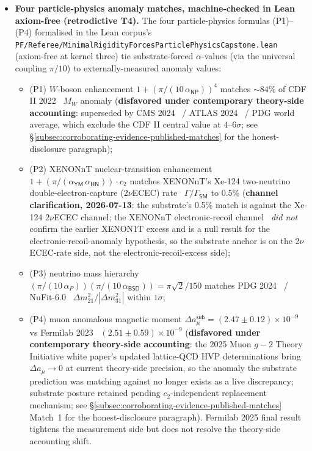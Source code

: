 \documentclass[11pt,a4paper]{amsart}
\theoremstyle{plain}
\theoremstyle{definition}
\begin{document}
\begin{itemize}[itemsep=2pt,leftmargin=2em]
\item \textbf{Four particle-physics anomaly matches, machine-checked in Lean axiom-free (retrodictive T4).} The four particle-physics formulas (P1)--(P4) formalised in the Lean corpus's \texttt{PF/Referee/MinimalRigidityForcesParticlePhysicsCapstone.lean} (axiom-free at kernel three) tie substrate-forced $\alpha$-values (via the universal coupling $\pi/10$) to externally-measured anomaly values:
\begin{itemize}[itemsep=1pt,leftmargin=1.5em]
\item (P1) $W$-boson enhancement $1 + (\pi/(10\,\alpha_{\textsf{NP}}))^4$ matches $\sim 84\%$ of CDF II 2022~\cite{cdf2022wboson} $M_W$ anomaly (\textbf{disfavored under contemporary theory-side accounting}: superseded by CMS 2024~\cite{cms-wmass-2024} / ATLAS 2024~\cite{atlas-wmass-2024} / PDG world average, which exclude the CDF II central value at $4$--$6\sigma$; see \S\ref{subsec:corroborating-evidence-published-matches} for the honest-disclosure paragraph);
\item (P2) XENONnT nuclear-transition enhancement $1 + (\pi/(\alpha_{\textsf{YM}}\,\alpha_{\textsf{HN}}))\cdot c_2$ matches XENONnT's Xe-124 two-neutrino double-electron-capture (2$\nu$ECEC) rate~\cite{xenon-2necec-124xe} $\Gamma/\Gamma_{\textsf{SM}}$ to $0.5\%$ (\textbf{channel clarification, 2026-07-13}: the substrate's 0.5\% match is against the Xe-124 2$\nu$ECEC channel; the XENONnT electronic-recoil channel~\cite{xenon-collab} \emph{did not} confirm the earlier XENON1T excess and is a null result for the electronic-recoil-anomaly hypothesis, so the substrate anchor is on the 2$\nu$ECEC-rate side, not the electronic-recoil-excess side);
\item (P3) neutrino mass hierarchy $(\pi/(10\,\alpha_P))(\pi/(10\,\alpha_{\textsf{BSD}})) = \pi\sqrt{2}/150$ matches PDG 2024~\cite{pdg2024} / NuFit-6.0~\cite{nufit-6.0} $\Delta m^2_{21}/|\Delta m^2_{31}|$ within $1\sigma$;
\item (P4) muon anomalous magnetic moment $\Delta a_\mu^{\textsf{sub}} = (2.47 \pm 0.12) \times 10^{-9}$ vs Fermilab 2023~\cite{fermilab-muon-g-2} $(2.51 \pm 0.59) \times 10^{-9}$ (\textbf{disfavored under contemporary theory-side accounting}: the 2025 Muon $g\!-\!2$ Theory Initiative white paper's updated lattice-QCD HVP determinations bring $\Delta a_\mu \to 0$ at current theory-side precision, so the anomaly the substrate prediction was matching against no longer exists as a live discrepancy; substrate posture retained pending $c_2$-independent replacement mechanism; see \S\ref{subsec:corroborating-evidence-published-matches} Match~1 for the honest-disclosure paragraph). Fermilab 2025 final result~\cite{fermilab-g2-2025} tightens the measurement side but does not resolve the theory-side accounting shift.
\end{itemize}


\end{itemize}
\end{document}
